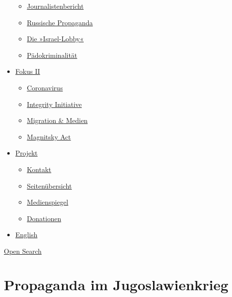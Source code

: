 \begin{itemize}
  \begin{itemize}
  \tightlist
  \item
    \href{https://swprs.org/bericht-eines-journalisten/}{Journalistenbericht}
  \item
    \href{https://swprs.org/russische-propaganda/}{Russische Propaganda}
  \item
    \href{https://swprs.org/die-israel-lobby-fakten-und-mythen/}{Die
    »Israel-Lobby«}
  \item
    \href{https://swprs.org/geopolitik-und-paedokriminalitaet/}{Pädokriminalität}
  \end{itemize}
\item
  \href{https://swprs.org/migration-und-medien/}{Fokus II}

  \begin{itemize}
  \tightlist
  \item
    \href{https://swprs.org/covid-19-hinweis-ii/}{Coronavirus}
  \item
    \href{https://swprs.org/die-integrity-initiative/}{Integrity
    Initiative}
  \item
    \href{https://swprs.org/migration-und-medien/}{Migration \& Medien}
  \item
    \href{https://swprs.org/der-fall-magnitsky/}{Magnitsky Act}
  \end{itemize}
\item
  \href{https://swprs.org/kontakt/}{Projekt}

  \begin{itemize}
  \tightlist
  \item
    \href{https://swprs.org/kontakt/}{Kontakt}
  \item
    \href{https://swprs.org/uebersicht/}{Seitenübersicht}
  \item
    \href{https://swprs.org/medienspiegel/}{Medienspiegel}
  \item
    \href{https://swprs.org/donationen/}{Donationen}
  \end{itemize}
\item
  \href{https://swprs.org/contact/}{English}
\end{itemize}

\protect\hyperlink{}{Open Search}

\hypertarget{propaganda-im-jugoslawienkrieg}{%
\section{Propaganda im
Jugoslawienkrieg}\label{propaganda-im-jugoslawienkrieg}}

